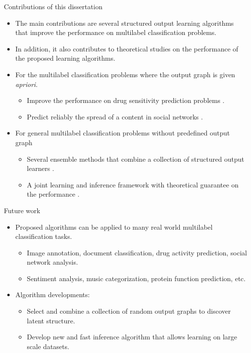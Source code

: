 \documentclass[first=purple,second=dgreen,logo=redexc]{aaltoslides}
\begin{document}
{\begin{frame}{Contributions of this dissertation}
	\begin{itemize}
		\item The main contributions are several structured output learning algorithms that improve the performance on multilabel classification problems.
		\item In addition, it also contributes to theoretical studies on the performance of the proposed learning algorithms.
		\item For the multilabel classification problems where the output graph is given \textit{apriori}.
		\begin{itemize}
			\footnotesize
			\item Improve the performance on drug sensitivity prediction problems \citep{su10structured}.
			\item Predict reliably the spread of a content in social networks \citep{su14structured}.
		\end{itemize}
		\item For general multilabel classification problems without predefined output graph
		\begin{itemize}
			\footnotesize
			\item Several ensemble methods that combine a collection of structured output learners \citep{su11mutitask,su2013multilabelacml,su14multilabel}.
			\item A joint learning and inference framework with theoretical guarantee on the performance \citep{su14multilabelnips}.
		\end{itemize}
	\end{itemize}
\end{frame}



\begin{frame}{Future work}
	\begin{itemize}
		\item Proposed algorithms can be applied to many real world multilabel classification tasks.
		\begin{itemize}
			\footnotesize
			\item Image annotation, document classification, drug activity prediction, social network analysis.
			\item Sentiment analysis, music categorization, protein function prediction, etc.
		\end{itemize}
		\item Algorithm developments:
		\begin{itemize}
			\footnotesize
			\item Select and combine a collection of random output graphs to discover latent structure.
			\item Develop new and fast inference algorithm that allows learning on large scale datasets.
		\end{itemize}
	\end{itemize}
\end{frame}


}
\end{document}
